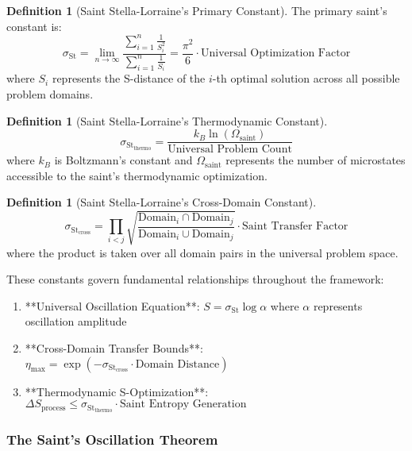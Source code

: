 \documentclass[11pt]{article}
\theoremstyle{definition}
\newtheorem{definition}[theorem]{Definition}
\theoremstyle{remark}
\newcommand{\StellasConstant}{\sigma_{\text{St}}}
\begin{document}
\begin{definition}[Saint Stella-Lorraine's Primary Constant]
The primary saint's constant is:
\begin{equation}
\StellasConstant = \lim_{n \to \infty} \frac{\sum_{i=1}^n \frac{1}{S_i^2}}{\sum_{i=1}^n \frac{1}{S_i}} = \frac{\pi^2}{6} \cdot \text{Universal Optimization Factor}
\end{equation}
where $S_i$ represents the S-distance of the $i$-th optimal solution across all possible problem domains.
\end{definition}

\begin{definition}[Saint Stella-Lorraine's Thermodynamic Constant]
\begin{equation}
\StellasConstant_{\text{thermo}} = \frac{k_B \ln(\Omega_{\text{saint}})}{\text{Universal Problem Count}}
\end{equation}
where $k_B$ is Boltzmann's constant and $\Omega_{\text{saint}}$ represents the number of microstates accessible to the saint's thermodynamic optimization.
\end{definition}

\begin{definition}[Saint Stella-Lorraine's Cross-Domain Constant]
\begin{equation}
\StellasConstant_{\text{cross}} = \prod_{i<j} \sqrt{\frac{\text{Domain}_i \cap \text{Domain}_j}{\text{Domain}_i \cup \text{Domain}_j}} \cdot \text{Saint Transfer Factor}
\end{equation}
where the product is taken over all domain pairs in the universal problem space.
\end{definition}

These constants govern fundamental relationships throughout the framework:

\begin{enumerate}
\item **Universal Oscillation Equation**: $S = \StellasConstant \log \alpha$ where $\alpha$ represents oscillation amplitude
\item **Cross-Domain Transfer Bounds**: $\eta_{\text{max}} = \exp(-\StellasConstant_{\text{cross}} \cdot \text{Domain Distance})$
\item **Thermodynamic S-Optimization**: $\Delta S_{\text{process}} \leq \StellasConstant_{\text{thermo}} \cdot \text{Saint Entropy Generation}$
\end{enumerate}

\subsubsection{The Saint's Oscillation Theorem}
\end{document}
